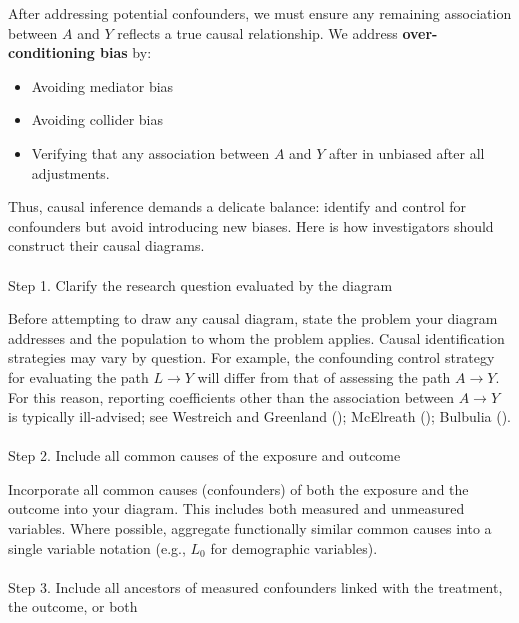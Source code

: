 \documentclass[
  single column]{article}
\makeatletter
\let\oldparagraph\paragraph
\renewcommand{\paragraph}{
    \@ifstar
      \xxxParagraphStar
      \xxxParagraphNoStar
  }
\newcommand{\xxxParagraphStar}[1]{\oldparagraph*{#1}\mbox{}}
\newcommand{\xxxParagraphNoStar}[1]{\oldparagraph{#1}\mbox{}}
\providecommand{\tightlist}{%
  \setlength{\itemsep}{0pt}\setlength{\parskip}{0pt}}\usepackage{longtable,booktabs,array}
\makeatother
\begin{document}
After addressing potential confounders, we must ensure any remaining
association between \(A\) and \(Y\) reflects a true causal relationship.
We address \textbf{over-conditioning bias} by:

\begin{itemize}
\tightlist
\item
  Avoiding mediator bias
\item
  Avoiding collider bias
\item
  Verifying that any association between \(A\) and \(Y\) after in
  unbiased after all adjustments.
\end{itemize}

Thus, causal inference demands a delicate balance: identify and control
for confounders but avoid introducing new biases. Here is how
investigators should construct their causal diagrams.

\paragraph{Step 1. Clarify the research question evaluated by the
diagram}\label{step-1.-clarify-the-research-question-evaluated-by-the-diagram}

Before attempting to draw any causal diagram, state the problem your
diagram addresses and the population to whom the problem applies. Causal
identification strategies may vary by question. For example, the
confounding control strategy for evaluating the path \(L\to Y\) will
differ from that of assessing the path \(A\to Y\). For this reason,
reporting coefficients other than the association between \(A \to Y\) is
typically ill-advised; see Westreich and Greenland
(); McElreath
(); Bulbulia
().

\paragraph{Step 2. Include all common causes of the exposure and
outcome}\label{step-2.-include-all-common-causes-of-the-exposure-and-outcome}

Incorporate all common causes (confounders) of both the exposure and the
outcome into your diagram. This includes both measured and unmeasured
variables. Where possible, aggregate functionally similar common causes
into a single variable notation (e.g., \(L_0\) for demographic
variables).

\paragraph{Step 3. Include all ancestors of measured confounders linked
with the treatment, the outcome, or
both}\label{step-3.-include-all-ancestors-of-measured-confounders-linked-with-the-treatment-the-outcome-or-both}
\end{document}
